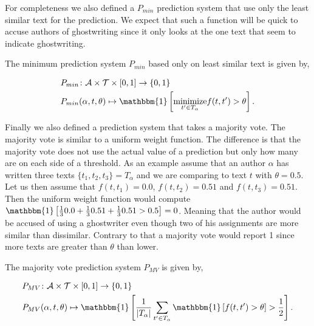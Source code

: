 For completeness we also defined a $P_{min}$ prediction system that use only the
least similar text for the prediction. We expect that such a function will be
quick to accuse authors of ghostwriting since it only looks at the one text that
seem to indicate ghostwriting.

\begin{definition}
    \label{def:minimum_prediction_system}

    The minimum prediction system $P_{min}$ based only on least similar text is
    given by,

    \begin{align}
        &P_{min} \colon \mathcal{A} \times \mathcal{T} \times [0, 1] \rightarrow
            \{0, 1\} \\
        &P_{min}(\alpha, t, \theta) \mapsto \mathbbm{1}\left[
                \underset{t' \in T_\alpha}{\text{minimize}} f(t, t') > \theta
            \right].
    \end{align}

\end{definition}

Finally we also defined a prediction system that takes a majority vote. The
majority vote is similar to a uniform weight function. The difference is that
the majority vote does not use the actual value of a prediction but only how
many are on each side of a threshold. As an example assume that an author
$\alpha$ has written three texts $\{t_1, t_2, t_3\} = T_\alpha$ and we are
comparing to text $t$ with $\theta = 0.5$. Let us then assume that $f(t, t_1)
= 0.0$, $f(t, t_2) = 0.51$ and $f(t, t_3) = 0.51$. Then the uniform weight
function would compute $\mathbbm{1} \left[ \frac{1}{3} 0.0 + \frac{1}{3} 0.51 +
\frac{1}{3} 0.51 > 0.5 \right] = 0$. Meaning that the author would be accused
of using a ghostwriter even though two of his assignments are more similar than
dissimilar. Contrary to that a majority vote would report 1 since more texts are
greater than $\theta$ than lower.

\begin{definition}
    \label{def:majority_vote_prediction_system}

    The majority vote prediction system $P_{MV}$ is given by,

    \begin{align}
        &P_{MV} \colon \mathcal{A} \times \mathcal{T} \times [0, 1] \rightarrow
            \{0, 1\} \\
        &P_{MV}(\alpha, t, \theta) \mapsto \mathbbm{1}\left[
                \frac{1}{|T_\alpha|} \sum_{t' \in T_\alpha} \mathbbm{1}\left[
                    f(t, t') > \theta
                \right] > \frac{1}{2}
            \right].
    \end{align}

\end{definition}


